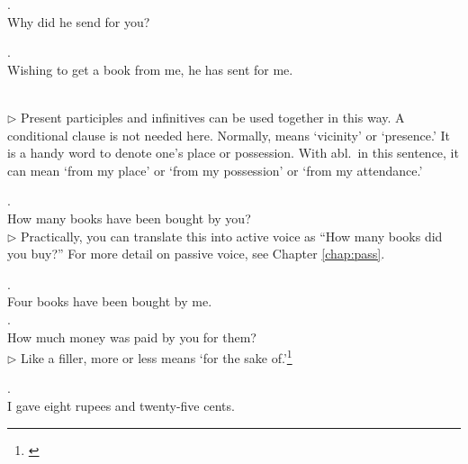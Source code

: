 \medskip
{}. \\
\hspace*{12mm}Why did he send for you?\\

\medskip
\parbox[lt]{0.93\linewidth}{\raggedright{}. \\
\hspace*{6mm}Wishing to get a book from me, he has sent for me.}\\[1mm]
{\small $\triangleright$ Present participles and infinitives can be used together in this way. A conditional clause is not needed here. Normally,  means `vicinity' or `presence.' It is a handy word to denote one's place or possession. With abl.\ in this sentence, it can mean `from my place' or `from my possession' or `from my attendance.'}

\medskip
{}. \\
\hspace*{12mm}How many books have been bought by you?\\
{\small $\triangleright$ Practically, you can translate this into active voice as ``How many books did you buy?'' For more detail on passive voice, see Chapter \ref{chap:pass}.}

\medskip
{}. \\
\hspace*{12mm}Four books have been bought by me.\\

\medskip
{}. \\
\hspace*{12mm}How much money was paid by you for them?\\
{\small $\triangleright$ Like a filler,  more or less means `for the sake of.'\footnote{\citealp[p.~68]{warder:intro}}}

\medskip
{}. \\
\hspace*{12mm}I gave eight rupees and twenty-five cents.\\

